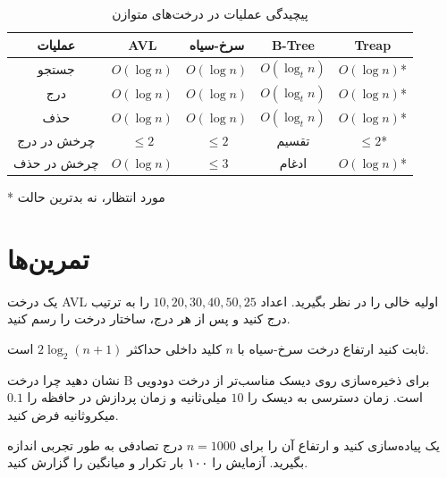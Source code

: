 \documentclass{matinbook}
\begin{document}
    \begin{table}[h]
        \centering
        \caption{پیچیدگی عملیات در درخت‌های متوازن}
        \label{tab:tree-complexity}
        \begin{tabular}{|c|c|c|c|c|}
            \hline
            \textbf{عملیات} & \textbf{AVL} & \textbf{سرخ-سیاه} & \textbf{B-Tree} & \textbf{Treap} \\
            \hline
            جستجو & $O(\log n)$ & $O(\log n)$ & $O(\log_{t} n)$ & $O(\log n)$* \\
            درج & $O(\log n)$ & $O(\log n)$ & $O(\log_{t} n)$ & $O(\log n)$* \\
            حذف & $O(\log n)$ & $O(\log n)$ & $O(\log_{t} n)$ & $O(\log n)$* \\
            چرخش در درج & $\leq 2$ & $\leq 2$ & تقسیم & $\leq 2$* \\
            چرخش در حذف & $O(\log n)$ & $\leq 3$ & ادغام & $O(\log n)$* \\
            \hline
        \end{tabular}
    \end{table}
    * مورد انتظار، نه بدترین حالت
    
    \section{تمرین‌ها}
    
    \begin{exercise}
        یک درخت AVL اولیه خالی را در نظر بگیرید.
        اعداد $10, 20, 30, 40, 50, 25$ را
        به ترتیب درج کنید و پس از هر درج،
        ساختار درخت را رسم کنید.
        \label{exc:avl-insert-sequence}
    \end{exercise}
    
    \begin{exercise}
        ثابت کنید ارتفاع درخت سرخ-سیاه
        با $n$ کلید داخلی حداکثر
        $2\log_{2}(n+1)$ است.
        \label{exc:rb-height-proof}
    \end{exercise}
    
    \begin{exercise}
        نشان دهید چرا درخت B برای ذخیره‌سازی
        روی دیسک مناسب‌تر از درخت دودویی است.
        زمان دسترسی به دیسک را $10$ میلی‌ثانیه
        و زمان پردازش در حافظه را $0.1$ میکروثانیه
        فرض کنید.
        \label{exc:b-tree-disk}
    \end{exercise}
    
    \begin{exercise}
        یک  پیاده‌سازی کنید
        و ارتفاع آن را برای $n = 1000$ درج تصادفی
        به طور تجربی اندازه بگیرید.
        آزمایش را ۱۰۰ بار تکرار و میانگین را گزارش کنید.
        \label{exc:treap-experiment}
    \end{exercise}
    
\end{document}
